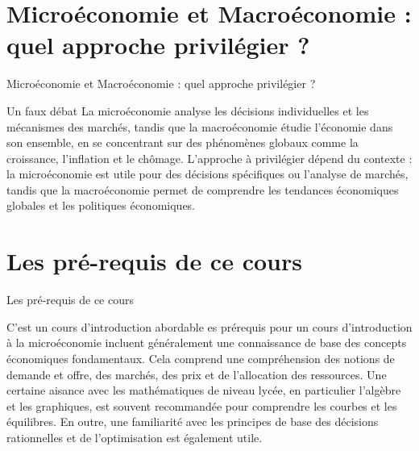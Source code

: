 \documentclass{beamer}
\begin{document}
\section{Microéconomie et Macroéconomie : quel approche privilégier ?}
	\begin{frame}{Microéconomie et Macroéconomie : quel approche privilégier ?}
				\begin{block}{Un faux débat}
		La microéconomie analyse les décisions individuelles et les mécanismes des marchés, tandis que la macroéconomie étudie l'économie dans son ensemble, en se concentrant sur des phénomènes globaux comme la croissance, l'inflation et le chômage. L'approche à privilégier dépend du contexte : la microéconomie est utile pour des décisions spécifiques ou l'analyse de marchés, tandis que la macroéconomie permet de comprendre les tendances économiques globales et les politiques économiques.
		\end{block}
	\end{frame}
	
	
\section{Les pré-requis de ce cours}
	\begin{frame}{Les pré-requis de ce cours}
		\begin{block}{C'est un cours d'introduction abordable}
		es prérequis pour un cours d'introduction à la microéconomie incluent généralement une connaissance de base des concepts économiques fondamentaux. Cela comprend une compréhension des notions de demande et offre, des marchés, des prix et de l'allocation des ressources. Une certaine aisance avec les mathématiques de niveau lycée, en particulier l'algèbre et les graphiques, est souvent recommandée pour comprendre les courbes et les équilibres. En outre, une familiarité avec les principes de base des décisions rationnelles et de l'optimisation est également utile.
		\end{block}
	\end{frame}
	
\end{document}
